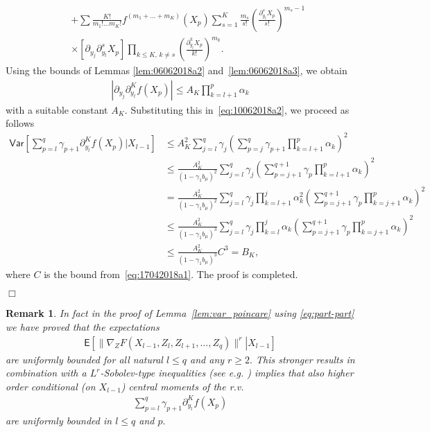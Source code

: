\documentclass[aap,preprint]{imsart}
\newcommand{\proofendsign}{$\Box$}
\newtheorem{remark}{Remark}
\newenvironment{proof}{{\noindent \bf Proof }}
 {{\hspace*{\fill}\proofendsign\par\bigskip}}
\begin{document}
\begin{proof}
\begin{eqnarray*}
&&+\sum\frac{K!}{m_{1}!\ldots m_{K}!}f^{(m_{1}+\ldots+m_{K})}(X_{p})
\sum_{s=1}^{K}\frac{m_{s}}{s!}
\left(\frac{\partial_{y_{l}}^{s}X_{p}}{s!}\right)^{m_{s}-1}
\\
&& \times\left[\partial_{y_{j}}\partial_{y_{l}}^{s}X_{p}\right]
\prod_{k\le K,\,k\neq s}\left(\frac{\partial_{y_{l}}^{k}X_{p}}{k!}\right)^{m_{k}}.
\end{eqnarray*}
Using the bounds of
Lemmas \ref{lem:06062018a2} and~\ref{lem:06062018a3},
we obtain
\begin{eqnarray}
\label{eq:part-part}
\left|\partial_{y_{j}}\partial_{y_{l}}^{K}f\left(X_{p}\right)\right|
\leq A_{K}\prod_{k=l+1}^{p}\alpha_{k}
\end{eqnarray}
with a suitable constant $A_{K}$.
Substituting this in~\eqref{eq:10062018a2},
we proceed as follows
\begin{align*}
\mathsf{Var}\left[\sum_{p=l}^{q}\gamma_{p+1}\partial_{y_{l}}^{K}f\left(X_{p}\right)\Big|X_{l-1}\right]
&\le
A_{K}^{2}\sum_{j=l}^{q}\gamma_{j}
\left(\sum_{p=j}^{q}\gamma_{p+1}\prod_{k=l+1}^{p}\alpha_{k}\right)^{2}
\\
&\le
\frac{A_{K}^{2}}{(1-\gamma_1 b_\mu)^2}
\sum_{j=l}^{q} \gamma_{j}
\left(
\sum_{p=j+1}^{q+1} \gamma_{p} \prod_{k=l+1}^{p} \alpha_{k}
\right)^{2}
\\
&=
\frac{A_{K}^{2}}{(1-\gamma_1 b_\mu)^2}
\sum_{j=l}^{q} \gamma_{j}
\prod_{k=l+1}^{j} \alpha_{k}^2
\left(
\sum_{p=j+1}^{q+1} \gamma_{p} \prod_{k=j+1}^{p} \alpha_{k}
\right)^{2}
\\
&\le
\frac{A_{K}^{2}}{(1-\gamma_1 b_\mu)^3}
\sum_{j=l}^{q} \gamma_{j}
\prod_{k=l}^{j} \alpha_{k}
\left(
\sum_{p=j+1}^{q+1} \gamma_{p} \prod_{k=j+1}^{p} \alpha_{k}
\right)^{2}
\\
&\le
\frac{A_{K}^{2}}{(1-\gamma_1 b_\mu)^3}C^3=B_K,
\end{align*}
where $C$ is the bound from~\eqref{eq:17042018a1}.
The proof is completed.
\end{proof}
\begin{remark}\label{rem:p-norm}
In fact in the proof of Lemma~\ref{lem:var_poincare} using \eqref{eq:part-part} we have proved that the expectations
\begin{eqnarray*}
\mathsf E\left[\left.
\|\nabla_Z F(X_{l-1},Z_l,Z_{l+1},\ldots,Z_q)\|^r
\right|X_{l-1}\right]
\end{eqnarray*}
are uniformly bounded for all natural \(l\leq q\) and any \(r\geq 2.\)  This stronger results in combination with a \(L^r\)-Sobolev-type inequalities (see e.g. \cite{Adamczak}) implies that also higher order conditional (on \(X_{l-1}\)) central moments of the r.v. 
\begin{eqnarray*}
\sum_{p=l}^{q}\gamma_{p+1}\partial_{y_{l}}^{K}f\left(X_{p}\right)
\end{eqnarray*}
are uniformly bounded in \(l\leq q\) and \(p.\)

\end{remark}
\end{document}
